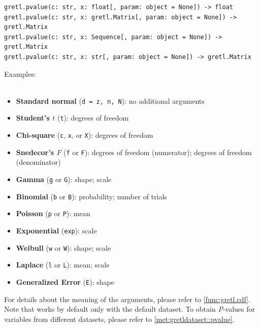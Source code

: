 \label{func:gretl.pvalue}
\begin{lstlisting}[style=pythonstylefoot]
gretl.pvalue(c: str, x: float[, param: object = None]) -> float
gretl.pvalue(c: str, x: gretl.Matrix[, param: object = None]) -> gretl.Matrix
gretl.pvalue(c: str, x: Sequence[, param: object = None]) -> gretl.Matrix
gretl.pvalue(c: str, x: str[, param: object = None]) -> gretl.Matrix
\end{lstlisting}
Examples:\newline
{}\\
\\
\begin{footnotesize}\begin{itemize}
		\item \textbf{Standard normal} (\texttt{d = z, n, N}): no additional arguments
		\item \textbf{Student's $t$} (\texttt{t}): degrees of freedom
		\item \textbf{Chi-square} (\texttt{c}, \texttt{x}, or \texttt{X}): degrees of freedom
		\item \textbf{Snedecor's $F$} (\texttt{f} or \texttt{F}): degrees of freedom (numerator); degrees of freedom (denominator)
		\item \textbf{Gamma} (\texttt{g} or \texttt{G}): shape; scale
		\item \textbf{Binomial} (\texttt{b} or \texttt{B}): probability; number of trials
		\item \textbf{Poisson} (\texttt{p} or \texttt{P}): mean
		\item \textbf{Exponential} (\texttt{exp}): scale
		\item \textbf{Weibull} (\texttt{w} or \texttt{W}): shape; scale
		\item \textbf{Laplace} (\texttt{l} or \texttt{L}): mean; scale
		\item \textbf{Generalized Error} (\texttt{E}): shape
\end{itemize}\end{footnotesize}
For details about the meaning of the arguments, please
refer to \ref{func:gretl.cdf}. Note that 
works by default only with the default dataset. To obtain \textit{P}-values
for variables from different datasets, please refer to \ref{met:gretldataset::pvalue}.

